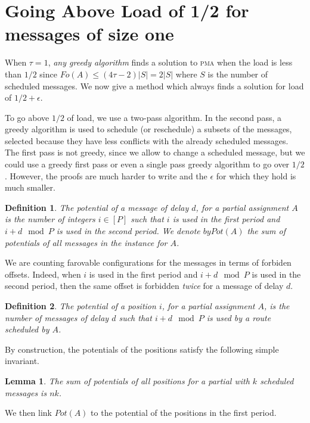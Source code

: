 \documentclass[10pt, conference, letterpaper]{IEEEtran}
\newtheorem{lemma}[theorem]{Lemma}
\newtheorem{definition}{Definition}
\newcommand\pma{\textsc{pma}\xspace}
\begin{document}
\section{Going Above Load of 1/2 for messages of size one}

When $\tau = 1$, \emph{any greedy algorithm} finds a solution to \pma when the load is less than $1/2$ since $Fo(A) \leq (4\tau -2)|S| = 2|S|$ where $S$ is the number of scheduled messages. We now give a method which always finds a solution for load of $1/2 + \epsilon$.

To go above $1/2$ of load, we use a two-pass algorithm. In the second pass, a greedy algorithm is used to schedule (or reschedule) a subsets of the messages, selected because they have less conflicts with the already scheduled messages. The first pass is not greedy, since we allow to change a scheduled message, but we could use a greedy first
pass or even a single pass greedy algorithm to go over $1/2$. However, the proofs are much harder to write and the $\epsilon$ for which they hold is much smaller.

\begin{definition}
The potential of a message of delay $d$, for a partial assignment $A$
is the number of integers $i \in [P]$ such that $i$ is used in the first period and $i+d \mod P$ is used in the second period. We denote $by Pot(A)$ the sum of potentials of all messages in the instance for $A$.
\end{definition} 

We are counting farovable configurations for the messages in terms of forbiden offsets.
Indeed, when $i$ is used in the first period and $i+d \mod P$ is used in the second period,
then the same offset is forbidden \emph{twice} for a message of delay $d$.

\begin{definition}
The potential of a position $i$, for a partial assignment $A$, is the number of messages of delay $d$ such that $i+d \mod P$ is used by a route scheduled by $A$. 
\end{definition}

By construction, the potentials of the positions satisfy the following simple invariant.
\begin{lemma}\label{lemma:inv}
The sum of potentials of all positions for a partial with $k$ scheduled messages is $nk$.  
\end{lemma}

We then link $Pot(A)$ to the potential of the positions in the first period.
\end{document}
